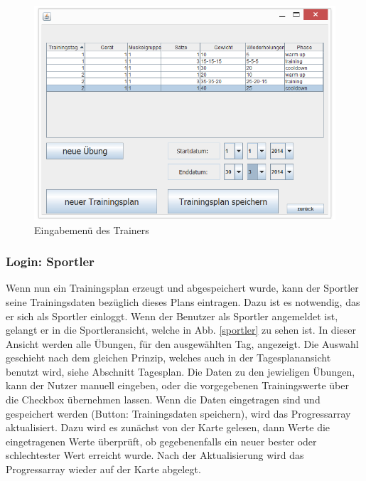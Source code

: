 \begin{figure}[h]
\includegraphics[width=1\hsize]{./images/Trainer.png}
\caption{Eingabemenü des Trainers}
\label{trainer}
\end{figure}



\subsubsection*{Login: Sportler}

Wenn nun ein Trainingsplan erzeugt und abgespeichert wurde, kann der Sportler seine Trainingsdaten bezüglich dieses Plans eintragen. Dazu ist es notwendig, das er sich als Sportler einloggt. Wenn der Benutzer als Sportler angemeldet ist, gelangt er in die Sportleransicht, welche in Abb. \ref{sportler} zu sehen ist. In dieser Ansicht werden alle Übungen, für den ausgewählten Tag, angezeigt. Die Auswahl geschieht nach dem gleichen Prinzip, welches auch in der Tagesplanansicht benutzt wird, siehe Abschnitt Tagesplan. Die Daten zu den jewieligen Übungen, kann der Nutzer manuell eingeben, oder die vorgegebenen Trainingswerte über die Checkbox übernehmen lassen. Wenn die Daten eingetragen sind und gespeichert werden (Button: Trainingsdaten speichern), wird das Progressarray aktualisiert. Dazu wird es zunächst von der Karte gelesen, dann Werte die eingetragenen Werte überprüft, ob gegebenenfalls ein neuer bester oder schlechtester Wert erreicht wurde. Nach der Aktualisierung wird das Progressarray wieder auf der Karte abgelegt. 

